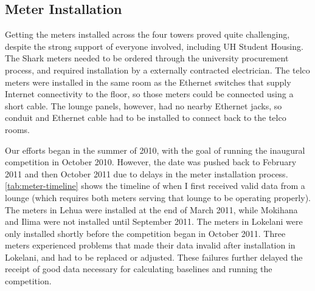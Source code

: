 \subsection{Meter Installation}
\label{sec:meter-installation}

Getting the meters installed across the four towers proved quite challenging, despite the strong support of everyone involved, including UH \Manoa Student Housing. The Shark meters needed to be ordered through the university procurement process, and required installation by a externally contracted electrician. The telco meters were installed in the same room as the Ethernet switches that supply Internet connectivity to the floor, so those meters could be connected using a short cable. The lounge panels, however, had no nearby Ethernet jacks, so conduit and Ethernet cable had to be installed to connect back to the telco rooms.

Our efforts began in the summer of 2010, with the goal of running the inaugural competition in October 2010. However, the date was pushed back to February 2011 and then October 2011 due to delays in the meter installation process. \autoref{tab:meter-timeline} shows the timeline of when I first received valid data from a lounge (which requires both meters serving that lounge to be operating properly). The meters in Lehua were installed at the end of March 2011, while Mokihana and Ilima were not installed until September 2011. The meters in Lokelani were only installed shortly before the competition began in October 2011. Three meters experienced problems that made their data invalid after installation in Lokelani, and had to be replaced or adjusted. These failures further delayed the receipt of good data necessary for calculating baselines and running the competition.

